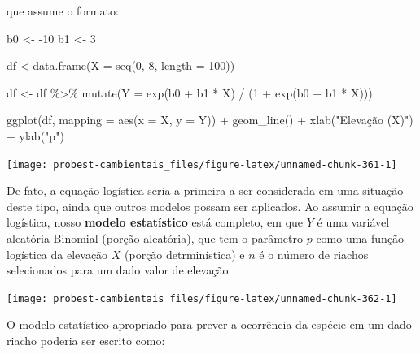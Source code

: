 \documentclass[
]{book}
\newenvironment{Shaded}{\begin{snugshade}}{\end{snugshade}}
\newcommand{\AttributeTok}[1]{\textcolor[rgb]{0.77,0.63,0.00}{#1}}
\newcommand{\DecValTok}[1]{\textcolor[rgb]{0.00,0.00,0.81}{#1}}
\newcommand{\FunctionTok}[1]{\textcolor[rgb]{0.00,0.00,0.00}{#1}}
\newcommand{\NormalTok}[1]{#1}
\newcommand{\OtherTok}[1]{\textcolor[rgb]{0.56,0.35,0.01}{#1}}
\newcommand{\SpecialCharTok}[1]{\textcolor[rgb]{0.00,0.00,0.00}{#1}}
\newcommand{\StringTok}[1]{\textcolor[rgb]{0.31,0.60,0.02}{#1}}
\begin{document}
que assume o formato:

\begin{Shaded}
\begin{Highlighting}[]
\NormalTok{b0 }\OtherTok{\textless{}{-}} \SpecialCharTok{{-}}\DecValTok{10}
\NormalTok{b1 }\OtherTok{\textless{}{-}} \DecValTok{3}

\NormalTok{df }\OtherTok{\textless{}{-}}\FunctionTok{data.frame}\NormalTok{(}\AttributeTok{X =} \FunctionTok{seq}\NormalTok{(}\DecValTok{0}\NormalTok{, }\DecValTok{8}\NormalTok{, }\AttributeTok{length =} \DecValTok{100}\NormalTok{))}

\NormalTok{df }\OtherTok{\textless{}{-}}\NormalTok{ df }\SpecialCharTok{\%\textgreater{}\%} \FunctionTok{mutate}\NormalTok{(}\AttributeTok{Y =} \FunctionTok{exp}\NormalTok{(b0 }\SpecialCharTok{+}\NormalTok{ b1 }\SpecialCharTok{*}\NormalTok{ X) }\SpecialCharTok{/}\NormalTok{ (}\DecValTok{1} \SpecialCharTok{+} \FunctionTok{exp}\NormalTok{(b0 }\SpecialCharTok{+}\NormalTok{ b1 }\SpecialCharTok{*}\NormalTok{ X)))}

\FunctionTok{ggplot}\NormalTok{(df, }\AttributeTok{mapping =} \FunctionTok{aes}\NormalTok{(}\AttributeTok{x =}\NormalTok{ X, }\AttributeTok{y =}\NormalTok{ Y)) }\SpecialCharTok{+}
  \FunctionTok{geom\_line}\NormalTok{() }\SpecialCharTok{+}
  \FunctionTok{xlab}\NormalTok{(}\StringTok{"Elevação (X)"}\NormalTok{) }\SpecialCharTok{+}
  \FunctionTok{ylab}\NormalTok{(}\StringTok{"p"}\NormalTok{)}
\end{Highlighting}
\end{Shaded}

\begin{center}\texttt{[image: probest-cambientais\_files/figure-latex/unnamed-chunk-361-1]} \end{center}

De fato, a equação logística seria a primeira a ser considerada em uma situação deste tipo, ainda que outros modelos possam ser aplicados. Ao assumir a equação logística, nosso \textbf{modelo estatístico} está completo, em que \(Y\) é uma variável aleatória Binomial (porção aleatória), que tem o parâmetro \(p\) como uma função logística da elevação \(X\) (porção detrminística) e \(n\) é o número de riachos selecionados para um dado valor de elevação.

\begin{center}\texttt{[image: probest-cambientais\_files/figure-latex/unnamed-chunk-362-1]} \end{center}

O modelo estatístico apropriado para prever a ocorrência da espécie em um dado riacho poderia ser escrito como:
\end{document}

